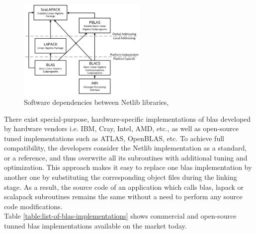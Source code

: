 \figpointer{\ref{fig:netlib:stack-of-libs}}
\begin{figure}[htpb]
  \centering
  \includegraphics[width=0.55\textwidth]{figures/chapter-2/lapack-scalapack-blas.png}
\caption[Software dependencies between Netlib libraries]{Software dependencies between Netlib libraries, \cite{netlib:lapack-scalapack-general-view}}
\label{fig:netlib:stack-of-libs}
\end{figure}


There exist special-purpose, hardware-specific implementations of \acrshort{blas} developed by hardware vendors i.e. IBM, Cray, Intel, AMD, etc., as well as open-source tuned implementations such as ATLAS, OpenBLAS, etc. To achieve full compatibility, the developers consider the Netlib implementation as a standard, or a reference, and thus overwrite all its subroutines with additional tuning and optimization. This approach makes it easy to replace one \acrshort{blas} implementation by another one by substituting the corresponding object files during the linking stage. As a result, the source code of an application which calls \acrshort{blas}, \acrshort{lapack} or \acrshort{scalapack} subroutines remains the same without a need to perform any source code modifications.\\
 

Table \ref{table:list-of-blas-implementations} shows commercial and open-source tunned \acrshort{blas} implementations available on the market today.\\

